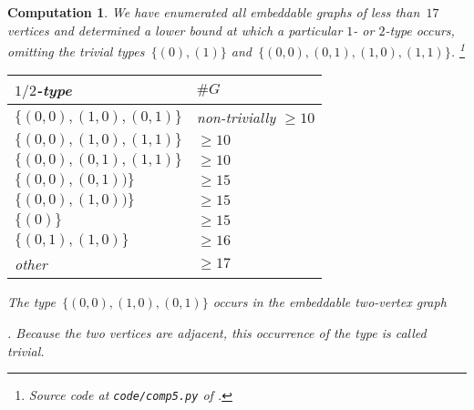 \documentclass{report}
\newtheorem{comp}{Computation}[section]
\begin{document}
\begin{comp}\label{comp:types}
    We have enumerated all embeddable graphs of less than~$17$ vertices
    and determined a lower bound at which a particular $1$- or $2$-type occurs,
    omitting the trivial types~$\{(0),(1)\}$
    and~$\{(0,0),(0,1),(1,0),(1,1)\}$.%
        \footnote{Source code at \texttt{code/comp5.py} of \cite{GH}.}
    \begin{center}
    \begin{tabular}{ll}
        $1/2$-type & $\#G$ \\ \hline
        $\{(0,0), (1,0), (0,1)\}$ &
            non-trivially $\geq 10$\\ 
        $\{(0,0), (1,0), (1,1)\}$ & $\geq 10$ \\
        $\{(0,0), (0,1), (1,1)\}$ & $\geq 10$ \\
        $\{(0,0), (0,1))\}$ & $\geq 15$ \\
        $\{(0,0), (1,0))\}$ & $\geq 15$ \\
        $\{(0)\}$ & $\geq 15$ \\
        $\{(0,1),(1,0)\}$ & $\geq 16$ \\
        other & $\geq 17$
    \end{tabular}
    \end{center}
    The type~$\{(0,0),(1,0),(0,1)\}$ occurs in the embeddable two-vertex
    graph
    .
    Because the two vertices are adjacent, this occurrence of
    the type is called trivial.
\end{comp}
\end{document}
